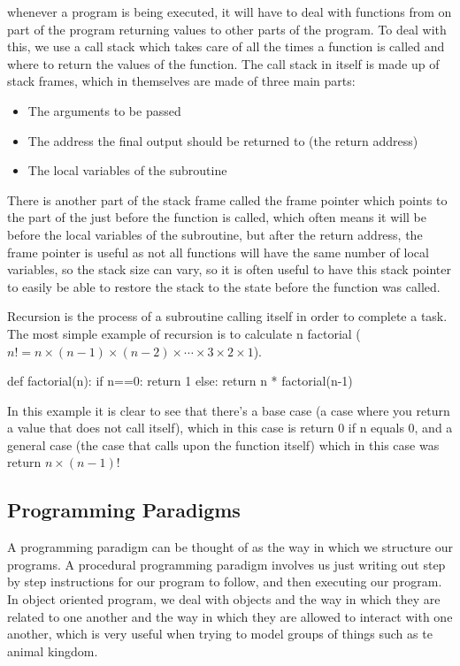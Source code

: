   \noindent
  whenever a program is being executed, it will have to deal with functions from on part of the program returning values to other parts of the program. To deal with this, we use a call stack which takes care of all the times a function is called and where to return the values of the function. The call stack in itself is made up of stack frames, which in themselves are made of three main parts:
  \begin{itemize}
  	\item The arguments to be passed
  	\item The address the final output should be returned to (the return address)
  	\item The local variables of the subroutine
  \end{itemize}
  There is another part of the stack frame called the frame pointer which points to the part of the just before the function is called, which often means it will be before the local variables of the subroutine, but after the return address, the frame pointer is useful as not all functions will have the same number of local variables, so the stack size can vary, so it is often useful to have this stack pointer to easily be able to restore the stack to the state before the function was called.
  
  \noindent
  Recursion is the process of a subroutine calling itself in order to complete a task. The most simple example of recursion is to calculate n factorial ($n! = n\times(n-1)\times(n-2)\times\cdots\times3\times2\times1$).
  
  \begin{python}
def factorial(n):
	if n==0:
		return 1
	else:
		return n * factorial(n-1)\end{python}
  
  In this example it is clear to see that there's a base case (a case where you return a value that does not call itself), which in this case is return 0 if n equals 0, and a general case (the case that calls upon the function itself) which in this case was return $n \times (n-1)!$
\subsection{Programming Paradigms}
  \noindent
  A programming paradigm can be thought of as the way in which we structure our programs. A procedural programming paradigm involves us just writing out step by step instructions for our program to follow, and then executing our program. In object oriented program, we deal with objects and the way in which they are related to one another and the way in which they are allowed to interact with one another, which is very useful when trying to model groups of things such as te animal kingdom.


